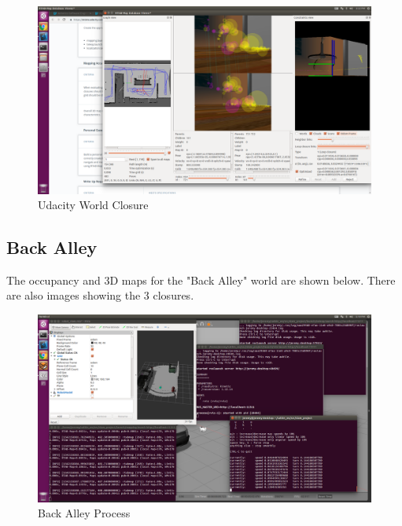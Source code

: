 \documentclass[10pt,journal,compsoc]{IEEEtran}
\begin{document}
\begin{figure}
    \centering
    \includegraphics[width=\linewidth]{closure_3}
    \caption{Udacity World Closure}
    \label{fig:closure 3}
\end{figure}

\subsection{Back Alley}

The occupancy and 3D maps for the "Back Alley" world are shown below. There are also images showing the 3 closures.

\begin{figure}
    \centering
    \includegraphics[width=\linewidth]{alley}
    \caption{Back Alley Process}
    \label{fig:alley_process}
\end{figure}
\end{document}
